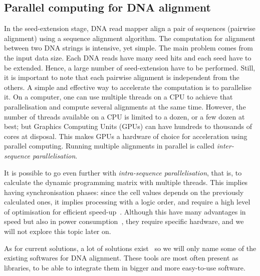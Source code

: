 \subsection{Parallel computing for DNA alignment}
In the seed-extension stage, DNA read mapper align a pair of sequences (pairwise alignment) using a sequence alignment algorithm.
The computation for alignment between two DNA strings is intensive, yet simple. The main problem comes from the input data size. Each DNA reads have many seed hits and each seed have to be extended. Hence, a large number of seed-extension have to be performed. Still, it is important to note that each pairwise alignment is independent from the others. A simple and effective way to accelerate the computation is to parallelise it. On a computer, one can use multiple threads on a CPU to achieve that parallelisation and compute several alignments at the same time. However, the number of threads available on a CPU is limited to a dozen, or a few dozen at best; but Graphics Computing Units (GPUs) can have hundreds to thousands of cores at disposal. This makes GPUs a hardware of choice for acceleration using parallel computing. Running multiple alignments in parallel is called \emph{inter-sequence parallelisation}. 

It is possible to go even further with \emph{intra-sequence parallelisation}, that is, to calculate the dynamic programming matrix with multiple threads. This implies having synchronisation phases: since the cell values depends on the previously calculated ones, it implies processing with a logic order, and require a high level of optimisation for efficient speed-up~\cite{Houtgast:gpu-accelerated}. Although this have many advantages in speed but also in power consumption~\cite{Houtgast:power-efficiency}, they require specific hardware, and we will not explore this topic later on.

As for current solutions, a lot of solutions exist~\cite{wiki:ListAlignmentSoft} so we will only name some of the existing softwares for DNA alignment. These tools are most often present as libraries, to be able to integrate them in bigger and more easy-to-use software.

